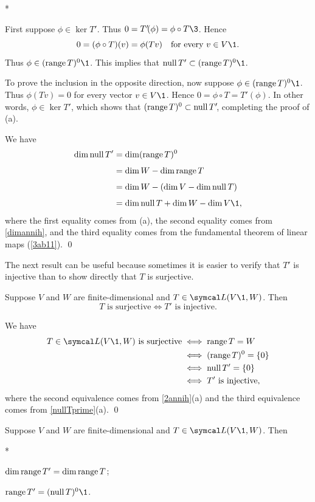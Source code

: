\proof
\begin{subtheorem}*
\item
First suppose $\phi \in \ker T'\!$. Thus $0 = T' \! (\phi) = \phi \circ T\3$. Hence
\[
0 = (\phi \circ T)(v) = \phi(Tv) \quad \text{for every\ } v \in V\1.
\]
Thus $\phi \in (\ran T)^0\1$. This implies that $\ker T' \subset (\ran T)^0\1$.

To prove the inclusion in the opposite direction, now suppose $\phi \in (\ran T)^0\1$. Thus $\phi(Tv) = 0$ for every vector $v \in V\1$. Hence \mbox{$0 = \phi \circ T = T' \! (\phi)$}. In other words, $\phi \in \ker T'\!$, which shows that $(\operatorname{range} T)^0 \subset \operatorname{null} T'\!$, completing the proof of (a).

\pagebreak[3]

\item
We have
\begin{align*}
\dim \ker T' &= \dim (\ran T)^0 \\[4bp]
&= \dim W - \dim \ran T \\[4bp]
&= \dim W - (\dim V - \dim \ker T) \\[4bp]
&= \dim \ker T + \dim W - \dim V\1,
\end{align*}
where the first equality comes from (a), the second equality comes from \ref{dimannih}, and the third equality comes from the fundamental theorem of linear maps (\ref{3ab11}).
\qed
\end{subtheorem}

\vspace{-3bp} %

The next result can be useful because sometimes it is easier to verify that $T'$ is injective than to show directly that $T$ is surjective.

{Suppose $V$ and $W$ are finite-dimensional and $T \in \L(V\1, W)$. Then
\[
T \text{ is surjective} \iff T' \text{ is injective}.
\]}

\proof
We have
\begin{align*}
T \in \L(V\1,W) \text{ is surjective} &\iff \ran T = W \\
&\iff (\ran T)^0 = \{0\} \\
&\iff \ker T' = \{0\} \\
&\iff T' \text{ is injective},
\end{align*}
where the second equivalence comes from \ref{2annih}(a) and the third equivalence comes from \ref{nullTprime}(a).
\qed

{Suppose $V$ and $W$ are finite-dimensional and $T \in \L(V\1, W)$. Then
\begin{subtheorem}*
\item
$\dim \operatorname{range} T' = \dim \operatorname{range} T$;
\item
$\ran T' = (\ker T)^0\1$.
\end{subtheorem}}

